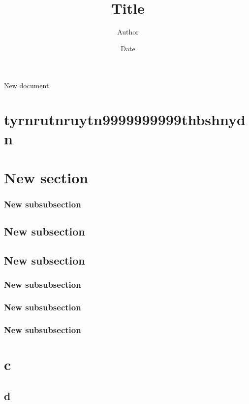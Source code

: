 \documentclass{article}
\begin{document}
\title{Title}
\author{Author}
\date{Date}
\maketitle
New document
\section{\textnormal{tyrnrutnruytn999\textbf{9999999thbshnydn}}}
\tableofcontents
\section{\textnormal{New section}}
\subsubsection{\textnormal{New subsubsection}}
\subsection{\textnormal{New subsection}}
\subsection{\textnormal{New subsection}}
\subsubsection{\textnormal{New subsubsection}}
\subsubsection{\textnormal{New subsubsection}}
\subsubsection{\textnormal{New subsubsection}}
\newpage
\section{\textnormal{c}}
\subsection{\textnormal{d}}
\end{document}
